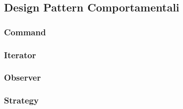 \documentclass{scalatekids-article}
\begin{document}
\subsection{Design Pattern Comportamentali}

\subsubsection{Command}

\subsubsection{Iterator}

\subsubsection{Observer}

\subsubsection{Strategy}

\newpage
\listoftables
\newpage
\listoffigures
\end{document}

